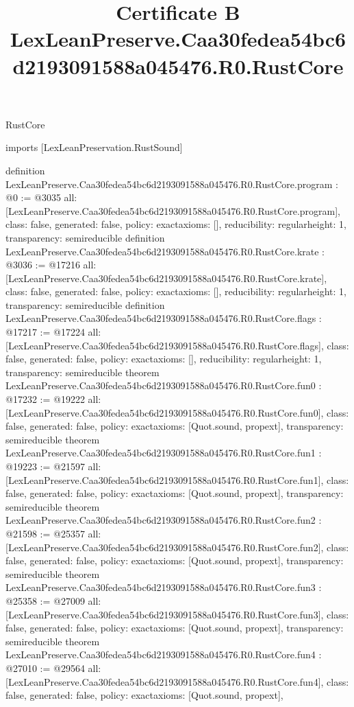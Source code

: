 \begin{lexlean}{RustCore}
\title{Certificate B LexLeanPreserve.Caa30fedea54bc6d2193091588a045476.R0.RustCore}
\begin{coremodule}
imports [LexLeanPreservation.RustSound]

definition LexLeanPreserve.Caa30fedea54bc6d2193091588a045476.R0.RustCore.program : @0 := @3035 {
  all: [LexLeanPreserve.Caa30fedea54bc6d2193091588a045476.R0.RustCore.program],
  class: false,
  generated: false,
  policy: exact{axioms: []},
  reducibility: regular{height: 1},
  transparency: semireducible
}
definition LexLeanPreserve.Caa30fedea54bc6d2193091588a045476.R0.RustCore.krate : @3036 := @17216 {
  all: [LexLeanPreserve.Caa30fedea54bc6d2193091588a045476.R0.RustCore.krate],
  class: false,
  generated: false,
  policy: exact{axioms: []},
  reducibility: regular{height: 1},
  transparency: semireducible
}
definition LexLeanPreserve.Caa30fedea54bc6d2193091588a045476.R0.RustCore.flags : @17217 := @17224 {
  all: [LexLeanPreserve.Caa30fedea54bc6d2193091588a045476.R0.RustCore.flags],
  class: false,
  generated: false,
  policy: exact{axioms: []},
  reducibility: regular{height: 1},
  transparency: semireducible
}
theorem LexLeanPreserve.Caa30fedea54bc6d2193091588a045476.R0.RustCore.fun0 : @17232 := @19222 {
  all: [LexLeanPreserve.Caa30fedea54bc6d2193091588a045476.R0.RustCore.fun0],
  class: false,
  generated: false,
  policy: exact{axioms: [Quot.sound, propext]},
  transparency: semireducible
}
theorem LexLeanPreserve.Caa30fedea54bc6d2193091588a045476.R0.RustCore.fun1 : @19223 := @21597 {
  all: [LexLeanPreserve.Caa30fedea54bc6d2193091588a045476.R0.RustCore.fun1],
  class: false,
  generated: false,
  policy: exact{axioms: [Quot.sound, propext]},
  transparency: semireducible
}
theorem LexLeanPreserve.Caa30fedea54bc6d2193091588a045476.R0.RustCore.fun2 : @21598 := @25357 {
  all: [LexLeanPreserve.Caa30fedea54bc6d2193091588a045476.R0.RustCore.fun2],
  class: false,
  generated: false,
  policy: exact{axioms: [Quot.sound, propext]},
  transparency: semireducible
}
theorem LexLeanPreserve.Caa30fedea54bc6d2193091588a045476.R0.RustCore.fun3 : @25358 := @27009 {
  all: [LexLeanPreserve.Caa30fedea54bc6d2193091588a045476.R0.RustCore.fun3],
  class: false,
  generated: false,
  policy: exact{axioms: [Quot.sound, propext]},
  transparency: semireducible
}
theorem LexLeanPreserve.Caa30fedea54bc6d2193091588a045476.R0.RustCore.fun4 : @27010 := @29564 {
  all: [LexLeanPreserve.Caa30fedea54bc6d2193091588a045476.R0.RustCore.fun4],
  class: false,
  generated: false,
  policy: exact{axioms: [Quot.sound, propext]},
}
\end{coremodule}
\end{lexlean}

